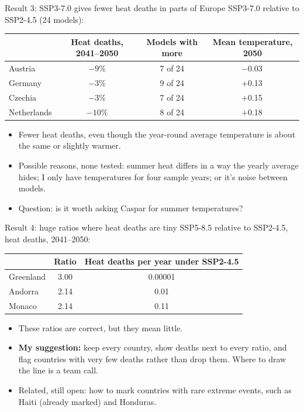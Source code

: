 \documentclass[aspectratio=169,11pt]{beamer}
\begin{document}
\begin{frame}{Result 3: SSP3-7.0 gives fewer heat deaths in parts of Europe}
  \small
  SSP3-7.0 relative to SSP2-4.5 (24 models):

  \medskip
  \centering
  \begin{tabular}{lccc}
    \toprule
    & Heat deaths, 2041--2050 & Models with more & Mean temperature, 2050 \\
    \midrule
    Austria     & $-9$\% & 7 of 24 & $-0.03$\,\textcelsius{} \\
    Germany     & $-3$\% & 9 of 24 & +0.13\,\textcelsius{} \\
    Czechia     & $-3$\% & 7 of 24 & +0.15\,\textcelsius{} \\
    Netherlands & $-10$\% & 8 of 24 & +0.18\,\textcelsius{} \\
    \bottomrule
  \end{tabular}

  \medskip
  \raggedright
  \begin{itemize}
    \item Fewer heat deaths, even though the year-round average temperature is
      about the same or slightly warmer.
    \item Possible reasons, none tested: summer heat differs in a way the
      yearly average hides; I only have temperatures for four sample years;
      or it's noise between models.
    \item Question: is it worth asking Caspar for summer temperatures?
  \end{itemize}
\end{frame}

\begin{frame}{Result 4: huge ratios where heat deaths are tiny}
  \small
  SSP5-8.5 relative to SSP2-4.5, heat deaths, 2041--2050:

  \medskip
  \centering
  \begin{tabular}{lcc}
    \toprule
    & Ratio & Heat deaths per year under SSP2-4.5 \\
    \midrule
    Greenland & 3.00 & 0.00001 \\
    Andorra   & 2.14 & 0.01 \\
    Monaco    & 2.14 & 0.11 \\
    \bottomrule
  \end{tabular}

  \medskip
  \raggedright
  \begin{itemize}
    \item These ratios are correct, but they mean little.
    \item \textbf{My suggestion:} keep every country, show deaths next to
      every ratio, and flag countries with very few deaths rather than drop
      them. Where to draw the line is a team call.
    \item Related, still open: how to mark countries with rare extreme
      events, such as Haiti (already marked) and Honduras.
  \end{itemize}
\end{frame}
\end{document}
